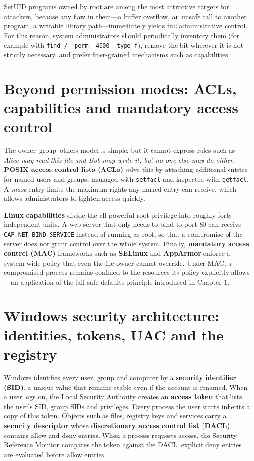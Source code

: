 SetUID programs owned by root are among the most attractive targets for attackers, because any flaw in them—a buffer overflow, an unsafe call to another program, a writable library path—immediately yields full administrative control. For this reason, system administrators should periodically inventory them (for example with \texttt{find / -perm -4000 -type f}), remove the bit wherever it is not strictly necessary, and prefer finer-grained mechanisms such as capabilities.

\section{Beyond permission modes: ACLs, capabilities and mandatory access control}\label{sec:2.3}
The owner–group–others model is simple, but it cannot express rules such as \emph{Alice may read this file and Bob may write it, but no one else may do either}. \textbf{POSIX access control lists (ACLs)} solve this by attaching additional entries for named users and groups, managed with \texttt{setfacl} and inspected with \texttt{getfacl}. A \emph{mask} entry limits the maximum rights any named entry can receive, which allows administrators to tighten access quickly.

\textbf{Linux capabilities} divide the all-powerful root privilege into roughly forty independent units. A web server that only needs to bind to port 80 can receive \texttt{CAP\_NET\_BIND\_SERVICE} instead of running as root, so that a compromise of the server does not grant control over the whole system. Finally, \textbf{mandatory access control (MAC)} frameworks such as \textbf{SELinux} and \textbf{AppArmor} enforce a system-wide policy that even the file owner cannot override. Under MAC, a compromised process remains confined to the resources its policy explicitly allows—an application of the fail-safe defaults principle introduced in Chapter 1.

\section{Windows security architecture: identities, tokens, UAC and the registry}\label{sec:2.4}
Windows identifies every user, group and computer by a \textbf{security identifier (SID)}, a unique value that remains stable even if the account is renamed. When a user logs on, the Local Security Authority creates an \textbf{access token} that lists the user's SID, group SIDs and privileges. Every process the user starts inherits a copy of this token. Objects such as files, registry keys and services carry a \textbf{security descriptor} whose \textbf{discretionary access control list (DACL)} contains allow and deny entries. When a process requests access, the Security Reference Monitor compares the token against the DACL; explicit deny entries are evaluated before allow entries.

